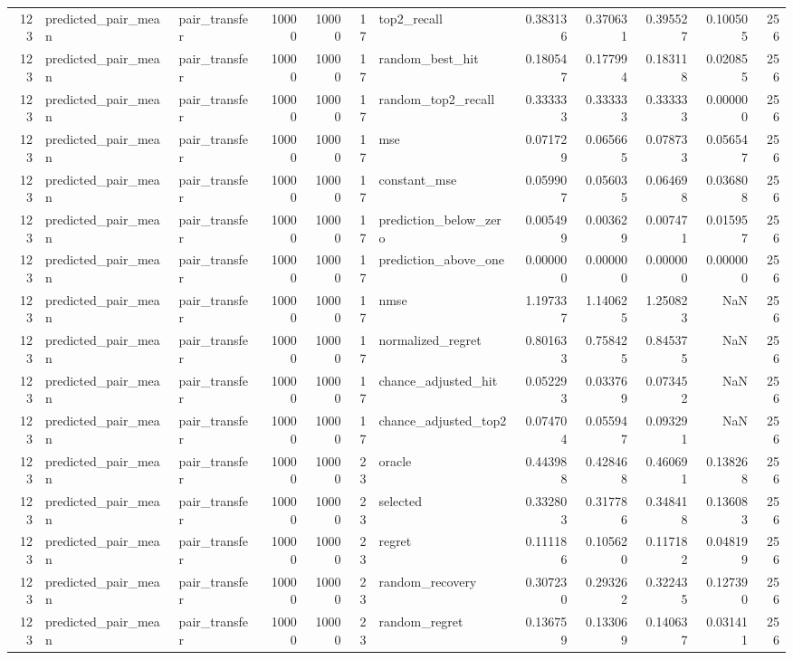 \begin{tabular}{rllrrrlrrrrr}
123 & predicted_pair_mean & pair_transfer & 10000 & 10000 & 17 & top2_recall & 0.383136 & 0.370631 & 0.395527 & 0.100505 & 256 \\
123 & predicted_pair_mean & pair_transfer & 10000 & 10000 & 17 & random_best_hit & 0.180547 & 0.177994 & 0.183118 & 0.020855 & 256 \\
123 & predicted_pair_mean & pair_transfer & 10000 & 10000 & 17 & random_top2_recall & 0.333333 & 0.333333 & 0.333333 & 0.000000 & 256 \\
123 & predicted_pair_mean & pair_transfer & 10000 & 10000 & 17 & mse & 0.071729 & 0.065665 & 0.078733 & 0.056547 & 256 \\
123 & predicted_pair_mean & pair_transfer & 10000 & 10000 & 17 & constant_mse & 0.059907 & 0.056035 & 0.064698 & 0.036808 & 256 \\
123 & predicted_pair_mean & pair_transfer & 10000 & 10000 & 17 & prediction_below_zero & 0.005499 & 0.003629 & 0.007471 & 0.015957 & 256 \\
123 & predicted_pair_mean & pair_transfer & 10000 & 10000 & 17 & prediction_above_one & 0.000000 & 0.000000 & 0.000000 & 0.000000 & 256 \\
123 & predicted_pair_mean & pair_transfer & 10000 & 10000 & 17 & nmse & 1.197337 & 1.140625 & 1.250823 & NaN & 256 \\
123 & predicted_pair_mean & pair_transfer & 10000 & 10000 & 17 & normalized_regret & 0.801633 & 0.758425 & 0.845375 & NaN & 256 \\
123 & predicted_pair_mean & pair_transfer & 10000 & 10000 & 17 & chance_adjusted_hit & 0.052293 & 0.033769 & 0.073452 & NaN & 256 \\
123 & predicted_pair_mean & pair_transfer & 10000 & 10000 & 17 & chance_adjusted_top2 & 0.074704 & 0.055947 & 0.093291 & NaN & 256 \\
123 & predicted_pair_mean & pair_transfer & 10000 & 10000 & 23 & oracle & 0.443988 & 0.428468 & 0.460691 & 0.138268 & 256 \\
123 & predicted_pair_mean & pair_transfer & 10000 & 10000 & 23 & selected & 0.332803 & 0.317786 & 0.348418 & 0.136083 & 256 \\
123 & predicted_pair_mean & pair_transfer & 10000 & 10000 & 23 & regret & 0.111186 & 0.105620 & 0.117182 & 0.048199 & 256 \\
123 & predicted_pair_mean & pair_transfer & 10000 & 10000 & 23 & random_recovery & 0.307230 & 0.293262 & 0.322435 & 0.127390 & 256 \\
123 & predicted_pair_mean & pair_transfer & 10000 & 10000 & 23 & random_regret & 0.136759 & 0.133069 & 0.140637 & 0.031411 & 256 \\

\end{tabular}

